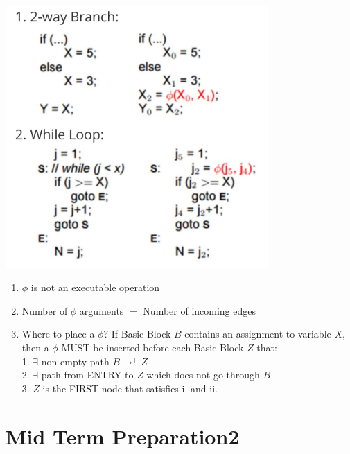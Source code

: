 \documentclass[a4paper]{article}
\theoremstyle{definition}
\begin{document}
\begin{enumerate}
\begin{enumerate}
    \includegraphics[width=10cm]{img/Snipaste_2021-04-19_17-50-16.png}
    \begin{enumerate}
      \item $\phi$ is not an executable operation
      \item Number of $\phi$ arguments $=$ Number of incoming edges
      \item Where to place a $\phi ?$ If Basic Block $B$ contains an assignment to variable $X$, then a $\phi$ MUST be inserted before each Basic Block $Z$ that:\\
      1. $\exists$ non-empty path $B \rightarrow^{+} Z$\\
      2. $\exists$ path from ENTRY to $Z$ which does not go through $B$\\
      3. $Z$ is the FIRST node that satisfies $\mathrm{i}$. and ii.
    \end{enumerate}
  \end{enumerate}
\end{enumerate}
\section{Mid Term Preparation2 }
\end{document}
